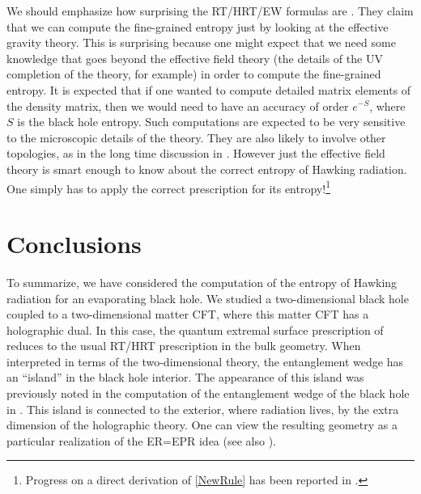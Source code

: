 \documentclass[11pt]{article}
\begin{document}
We should emphasize how surprising the RT/HRT/EW formulas are \cite{Ryu:2006bv, Hubeny:2007xt, Engelhardt:2014gca}. 
They claim that we can compute the fine-grained entropy just by looking at the effective gravity theory.
This is surprising because one might expect that we need some knowledge that goes beyond the effective field theory (the details of the UV completion of the theory, for example) in order to compute the fine-grained entropy.
It is expected that if one wanted to compute detailed matrix elements of the density matrix, then we would need to have an accuracy of order $e^{-S}$, where $S$ is the black hole entropy. 
Such computations are expected to be very sensitive to the microscopic details of the theory. They are also  likely to involve other topologies, as in the long time discussion in \cite{Saad:2018bqo,Saad:2019lba}.
However just the effective field theory is smart enough to know about the correct entropy of Hawking radiation. 
One simply has to apply the correct prescription for its entropy!\footnote{Progress on a direct derivation of \eqref{NewRule} has been reported in \cite{PeningtonWIP,AlmheiriWIP}. }


\section{Conclusions}
\label{sec:conclude}

To summarize,
we have considered the computation of the entropy of Hawking radiation for an evaporating black hole. 
We studied a two-dimensional black hole coupled to a two-dimensional matter CFT, where this matter CFT has a holographic dual. 
In this case, the quantum extremal surface prescription of \cite{Engelhardt:2014gca} reduces to the usual RT/HRT \cite{Ryu:2006bv,Hubeny:2007xt} prescription in the bulk geometry.
When interpreted in terms of the two-dimensional theory, the entanglement wedge has an ``island'' in the black hole interior. 
The appearance of this island was previously noted in the computation of the entanglement wedge of the black hole in \cite{Penington:2019npb,Almheiri:2019psf}. 
This island is connected to the exterior, where radiation lives, by the extra dimension of the holographic theory. 
One can view the resulting geometry as a particular realization of the ER=EPR \cite{Maldacena:2013xja, Maldacena:2013t1} idea (see also \cite{Susskind:2012uw, Papadodimas:2012aq}). 
\end{document}
